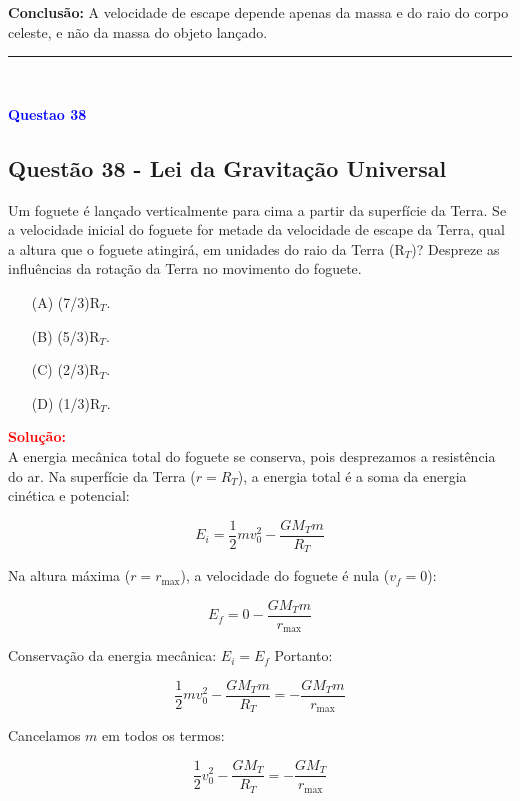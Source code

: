 \noindent
\textbf{Conclusão:} A velocidade de escape depende apenas da massa e do raio do corpo celeste, e não da massa do objeto lançado.

\noindent\rule{\linewidth}{0.6pt}\\

\begin{flushleft}
\textbf{\textcolor{blue}{\Large Questao 38}}\\
\noindent
\subsection{Quest\~ao 38 - Lei da Gravitação Universal}
Um foguete é lançado verticalmente para cima a partir da
superfície da Terra. Se a velocidade inicial do foguete for
metade da velocidade de escape da Terra, qual a altura que
o foguete atingirá, em unidades do raio da Terra (R$_{T}$)?
Despreze as influências da rotação da Terra no movimento
do foguete.

\begin{itemize}
\item[(A)] (7/3)R$_{T}$.
\item[(B)] (5/3)R$_{T}$.
\item[(C)] (2/3)R$_{T}$.
\item[(D)] (1/3)R$_{T}$.
\end{itemize}

\vspace{0.5cm}

\textcolor{red}{\textbf{Solução:}}\\

A energia mecânica total do foguete se conserva, pois desprezamos a resistência do ar.  
Na superfície da Terra (\(r = R_T\)), a energia total é a soma da energia cinética e potencial:  

\[
E_i = \frac{1}{2} m v_0^2 - \frac{G M_T m}{R_T}
\]

Na altura máxima (\(r = r_{\text{max}}\)), a velocidade do foguete é nula (\(v_f = 0\)):  

\[
E_f = 0 - \frac{G M_T m}{r_{\text{max}}}
\]

Conservação da energia mecânica: \(E_i = E_f\)  
Portanto:

\[
\frac{1}{2} m v_0^2 - \frac{G M_T m}{R_T} = - \frac{G M_T m}{r_{\text{max}}}
\]

Cancelamos \(m\) em todos os termos:

\[
\frac{1}{2} v_0^2 - \frac{G M_T}{R_T} = - \frac{G M_T}{r_{\text{max}}}
\]


\end{flushleft}
